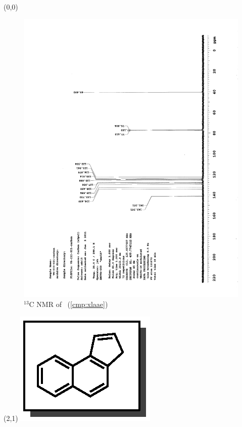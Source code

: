 \clearpage
\begin{textblock}{20}(0,0)
\begin{figure}[htb]
\caption{$^{13}$C NMR of  \CMPxlaae\ (\ref{cmp:xlaae})}
\includegraphics[scale=0.75, trim = 0mm 0mm 0mm 5mm,
clip]{chp_asymmetric/images/nmr/xlaaeC}
\vspace{-100pt}
\end{figure}
\end{textblock}
\begin{textblock}{1}(2,1)
\includegraphics[scale=0.8, angle=90]{chp_asymmetric/images/xlaae}
\end{textblock}
\clearpage


